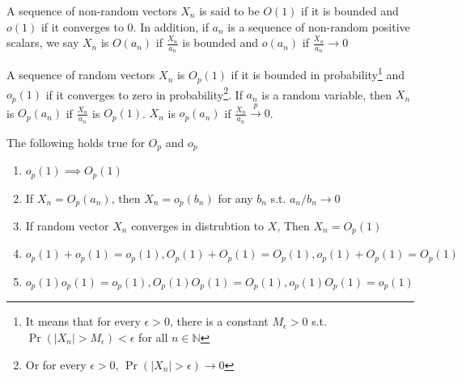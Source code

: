 \begin{mdframed}[backgroundcolor=blue!5] 
\begin{definition}
A sequence of non-random vectors $X_n$ is said to be $O(1)$ if it is bounded and $o(1)$ if it converges to 0. In addition, if $a_n$ is a sequence of non-random positive scalars, we say $X_n$ is $O(a_n)$ if $\frac{X_n}{a_n}$ is bounded and $o(a_n)$ if $\frac{X_n}{a_n}\to0$
\end{definition}
\begin{definition}
A sequence of random vectors $X_n$ is $O_p(1)$ if it is bounded in probability\footnote{It means that for every $\epsilon>0$, there is a constant $M_\epsilon>0$ s.t. $\Pr(|X_n|>M_\epsilon)< \epsilon$ for all $n\in\mathbb{N}$} and $o_p(1)$ if it converges to zero in probability\footnote{Or for every $\epsilon>0$, $\Pr(|X_n|>\epsilon)\to0$}. If $a_n$ is a random variable, then $X_n$ is $O_p(a_n)$ if $\frac{X_n}{a_n}$ is $O_p(1)$. $X_n$ is $o_p(a_n)$ if $\frac{X_n}{a_n}\xrightarrow{p}0$.
\end{definition}
\begin{property}
The following holds true for $O_p$ and $o_p$
\small{\begin{enumerate}
\item $o_p(1)\implies O_p(1)$
\item If $X_n=O_p(a_n)$, then $X_n=o_p(b_n)$ for any $b_n$ s.t. $a_n/b_n\to0$
\item If random vector $X_n$ converges in distrubtion to $X$, Then $X_n=O_p(1)$
\item $o_p(1)+o_p(1)=o_p(1), O_p(1)+O_p(1)=O_p(1), o_p(1)+O_p(1)=O_p(1)$
\item $o_p(1)o_p(1)=o_p(1), O_p(1)O_p(1)=O_p(1), o_p(1)O_p(1)=o_p(1)$
\end{enumerate}}\normalsize
\end{property}
\end{mdframed} \par
